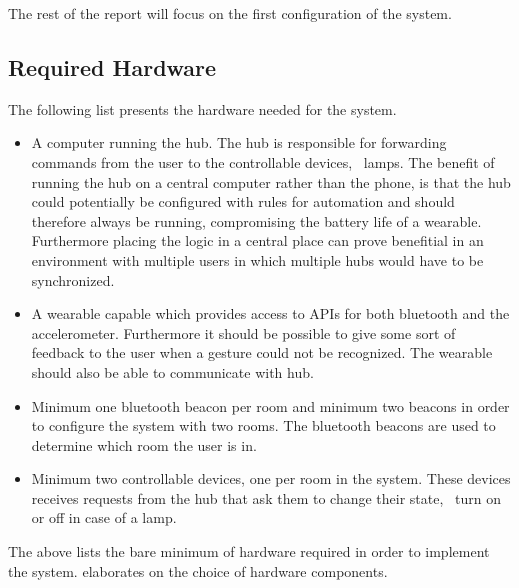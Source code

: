 The rest of the report will focus on the first configuration of the system.

\subsection{Required Hardware}
\label{sec:analysis:system-components:required-hardware}

The following list presents the hardware needed for the system.

\begin{itemize}
\item A computer running the hub. The hub is responsible for forwarding commands from the user to the controllable devices, \eg~lamps. The benefit of running the hub on a central computer rather than the phone, is that the hub could potentially be configured with rules for automation and should therefore always be running, compromising the battery life of a wearable. Furthermore placing the logic in a central place can prove benefitial in an environment with multiple users in which multiple hubs would have to be synchronized.
\item A wearable capable which provides access to APIs for both bluetooth and the accelerometer. Furthermore it should be possible to give some sort of feedback to the user when a gesture could not be recognized. The wearable should also be able to communicate with hub.
\item Minimum one bluetooth beacon per room and minimum two beacons in order to configure the system with two rooms. The bluetooth beacons are used to determine which room the user is in.
\item Minimum two controllable devices, one per room in the system. These devices receives requests from the hub that ask them to change their state, \eg~turn on or off in case of a lamp.
\end{itemize}

The above lists the bare minimum of hardware required in order to implement the system.  elaborates on the choice of hardware components.



